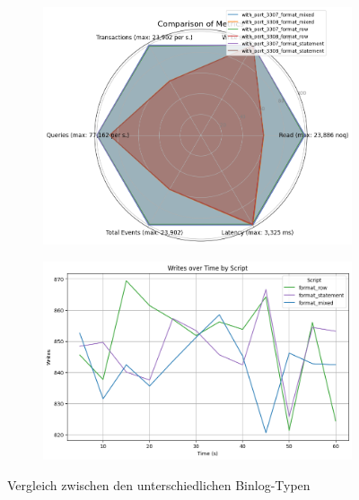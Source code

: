 \vspace{-7pt}
\begin{figure}[H]
  \centering
  \begin{subfigure}[t]{0.42\textwidth}
    \includegraphics[width=\textwidth]{PNGs/Script/Replication/replication-format-change/statistics}
  \end{subfigure}
  \hfill
  \begin{subfigure}[t]{0.48\textwidth}
    \includegraphics[width=\textwidth]{PNGs/Script/Replication/replication-format-change/Writes}
  \end{subfigure}
  \vspace{-8pt}
  \caption[Replikation: Unterschiedliche Binlog-Typen]{Vergleich zwischen den unterschiedlichen Binlog-Typen }
  \label{fig:replication-format-change}
\end{figure}
\vspace{-20pt}

